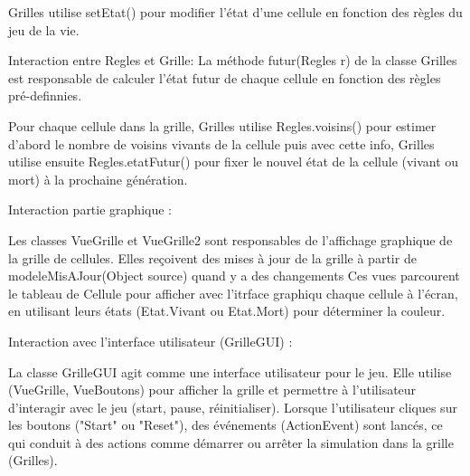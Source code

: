 Grilles utilise setEtat() pour modifier l'état d'une cellule en fonction des règles du jeu de la vie.

Interaction entre Regles et Grille:
La méthode futur(Regles r) de la classe Grilles est responsable de calculer l'état futur de chaque cellule en fonction des règles pré-definnies.

Pour chaque cellule dans la grille, Grilles utilise Regles.voisins() pour estimer d'abord le nombre de voisins vivants de la cellule puis avec cette info, Grilles utilise ensuite Regles.etatFutur() pour fixer le nouvel état de la cellule (vivant ou mort) à la prochaine génération.


Interaction partie graphique :

Les classes VueGrille et VueGrille2 sont responsables de l'affichage graphique de la grille de cellules.
Elles reçoivent des mises à jour de la grille à partir de modeleMisAJour(Object source) quand y a des changements
Ces vues parcourent le tableau de Cellule pour afficher avec l'itrface graphiqu chaque cellule à l'écran, en utilisant leurs états (Etat.Vivant ou Etat.Mort) pour déterminer la couleur.

Interaction avec l'interface utilisateur (GrilleGUI) :

La classe GrilleGUI agit comme une interface utilisateur pour le jeu.
Elle utilise (VueGrille, VueBoutons) pour afficher la grille et permettre à l'utilisateur d'interagir avec le jeu (start, pause, réinitialiser).
Lorsque l'utilisateur cliques sur les boutons ("Start" ou "Reset"), des événements (ActionEvent) sont lancés, ce qui conduit à des actions comme démarrer ou arrêter la simulation dans la grille (Grilles).
